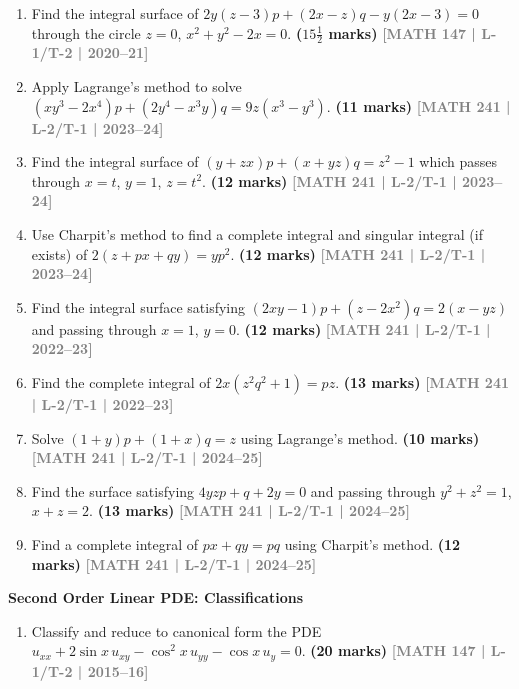 \documentclass[12pt,a4paper]{article}
\newcommand{\yr}[1]{\hfill\textcolor{gray}{\small\textbf{[#1]}}}
\newcommand{\mk}[1]{\textcolor{orange!70!black}{\small\textbf{(#1 marks)}}}
\newcommand{\subtopic}[2]{%
  \vspace{10pt}
  \noindent\begin{tcolorbox}[colback=#1!8,colframe=#1,boxrule=0.6pt,arc=4pt,
    left=6pt,right=6pt,top=4pt,bottom=4pt]
    \small\bfseries\textcolor{#1}{#2}
  \end{tcolorbox}
  \vspace{2pt}
}
\begin{document}
\begin{enumerate}
\item Find the integral surface of $2y(z-3)p+(2x-z)q-y(2x-3)=0$ through the circle $z=0$, $x^{2}+y^{2}-2x=0$.
\mk{$15\tfrac{1}{2}$} \yr{MATH 147 | L-1/T-2 | 2020--21}

\item Apply Lagrange's method to solve $(xy^{3}-2x^{4})p+(2y^{4}-x^{3}y)q=9z(x^{3}-y^{3})$.
\mk{11} \yr{MATH 241 | L-2/T-1 | 2023--24}

\item Find the integral surface of $(y+zx)p+(x+yz)q=z^{2}-1$ which passes through $x=t$, $y=1$, $z=t^{2}$.
\mk{12} \yr{MATH 241 | L-2/T-1 | 2023--24}

\item Use Charpit's method to find a complete integral and singular integral (if exists) of $2(z+px+qy)=yp^{2}$.
\mk{12} \yr{MATH 241 | L-2/T-1 | 2023--24}

\item Find the integral surface satisfying $(2xy-1)p+(z-2x^{2})q=2(x-yz)$ and passing through $x=1$, $y=0$.
\mk{12} \yr{MATH 241 | L-2/T-1 | 2022--23}

\item Find the complete integral of $2x(z^{2}q^{2}+1)=pz$.
\mk{13} \yr{MATH 241 | L-2/T-1 | 2022--23}

\item Solve $(1+y)p+(1+x)q=z$ using Lagrange's method.
\mk{10} \yr{MATH 241 | L-2/T-1 | 2024--25}

\item Find the surface satisfying $4yzp+q+2y=0$ and passing through $y^{2}+z^{2}=1$, $x+z=2$.
\mk{13} \yr{MATH 241 | L-2/T-1 | 2024--25}

\item Find a complete integral of $px+qy=pq$ using Charpit's method.
\mk{12} \yr{MATH 241 | L-2/T-1 | 2024--25}

\end{enumerate}

\subtopic{cF}{Second Order Linear PDE: Classifications}
\label{sub:s6-second}

\begin{enumerate}

\item Classify and reduce to canonical form the PDE $u_{xx}+2\sin x\,u_{xy}-\cos^{2}x\,u_{yy}-\cos x\,u_{y}=0$.
\mk{20} \yr{MATH 147 | L-1/T-2 | 2015--16}

\end{enumerate}
\end{document}
